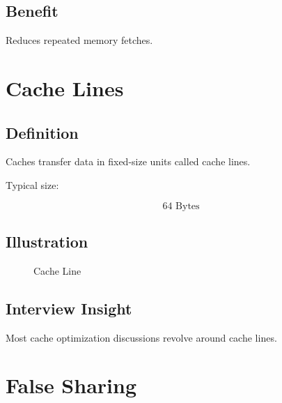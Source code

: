 \subsection{Benefit}

Reduces repeated memory fetches.

\section{Cache Lines}

\subsection{Definition}

Caches transfer data in fixed-size units called cache lines.

Typical size:

\[
64 \text{ Bytes}
\]

\subsection{Illustration}

\begin{figure}[h]
\centering


\caption{Cache Line}
\end{figure}

\subsection{Interview Insight}

Most cache optimization discussions revolve around cache lines.

\section{False Sharing}


